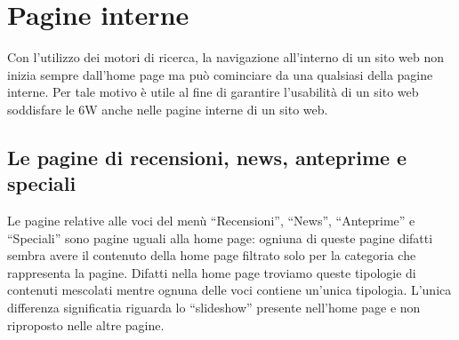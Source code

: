 \documentclass[../ProgettoTecWeb2.tex]{subfiles}
\begin{document}
\section{Pagine interne}
	Con l'utilizzo dei motori di ricerca, la navigazione all'interno di un sito web non inizia sempre dall'home page ma può cominciare da una qualsiasi della pagine interne. Per tale motivo è utile al fine di garantire l'usabilità di un sito web soddisfare le 6W anche nelle pagine interne di un sito web.

	\subsection{Le pagine di recensioni, news, anteprime e speciali}
	Le pagine relative alle voci del menù ``Recensioni'', ``News'', ``Anteprime'' e ``Speciali'' sono pagine uguali alla home page: ogniuna di queste pagine difatti sembra avere il contenuto della home page filtrato solo per la categoria che rappresenta la pagine. Difatti nella home page troviamo queste tipologie di contenuti mescolati mentre ognuna delle voci contiene un'unica tipologia.
	L'unica differenza significatia riguarda lo ``slideshow'' presente nell'home page e non riproposto nelle altre pagine.
\end{document}
